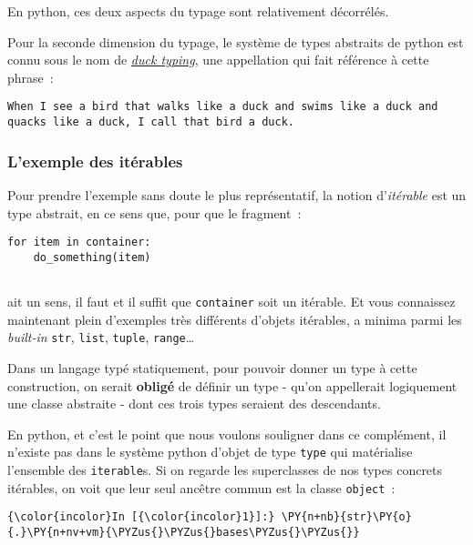     En python, ces deux aspects du typage sont relativement décorrélés.

    Pour la seconde dimension du typage, le système de types abstraits de
python est connu sous le nom de
\href{http://en.wikipedia.org/wiki/Duck_typing}{\emph{duck typing}}, une
appellation qui fait référence à cette phrase~:

\begin{verbatim}
When I see a bird that walks like a duck and swims like a duck and quacks like a duck, I call that bird a duck.
\end{verbatim}

    \hypertarget{lexemple-des-ituxe9rables}{%
\subsubsection{L'exemple des
itérables}\label{lexemple-des-ituxe9rables}}

    Pour prendre l'exemple sans doute le plus représentatif, la notion
d'\emph{itérable} est un type abstrait, en ce sens que, pour que le
fragment~:

\begin{verbatim}
for item in container:
    do_something(item)
    
\end{verbatim}

ait un sens, il faut et il suffit que \texttt{container} soit un
itérable. Et vous connaissez maintenant plein d'exemples très différents
d'objets itérables, a minima parmi les \emph{built-in} \texttt{str},
\texttt{list}, \texttt{tuple}, \texttt{range}\ldots{}

    Dans un langage typé statiquement, pour pouvoir donner un type à cette
construction, on serait \textbf{obligé} de définir un type - qu'on
appellerait logiquement une classe abstraite - dont ces trois types
seraient des descendants.

    En python, et c'est le point que nous voulons souligner dans ce
complément, il n'existe pas dans le système python d'objet de type
\texttt{type} qui matérialise l'ensemble des \texttt{iterable}s. Si on
regarde les superclasses de nos types concrets itérables, on voit que
leur seul ancêtre commun est la classe \texttt{object}~:

    \begin{Verbatim}[commandchars=\\\{\}]
{\color{incolor}In [{\color{incolor}1}]:} \PY{n+nb}{str}\PY{o}{.}\PY{n+nv+vm}{\PYZus{}\PYZus{}bases\PYZus{}\PYZus{}}
\end{Verbatim}



